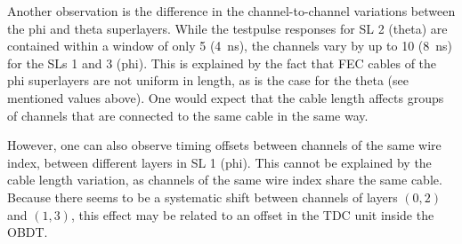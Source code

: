 \par Another observation is the difference in the channel-to-channel variations between the phi and theta superlayers. While the testpulse responses for \ac{SL} 2 (theta) are contained within a window of only \SI{5}{\tu} (\SI{4}{\nano\second}), the channels vary by up to \SI{10}{\tu} (\SI{8}{\nano\second}) for the \acp{SL} 1 and 3 (phi). This is explained by the fact that \ac{FEC} cables of the phi superlayers are not uniform in length, as is the case for the theta (see mentioned values above). One would expect that the cable length affects groups of channels that are connected to the same cable in the same way.
\par However, one can also observe timing offsets between channels of the same wire index, between different layers in \ac{SL} 1 (phi). This cannot be explained by the cable length variation, as channels of the same wire index share the same cable. Because there seems to be a systematic shift between channels of layers $(0, 2)$ and $(1, 3)$, this effect may be related to an offset in the \ac{TDC} unit inside the \ac{OBDT}.
